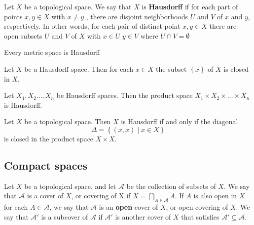 \documentclass{article}
\theoremstyle{remark}
\begin{document}
\begin{definition}[Hausdorff]

    Let $X $ be a topological space. We say that $X$ is \textbf{Hausdorff} if for each part of points $x,y  \in X $ with
    $x\neq y$ , there are disjoint neighborhoods $U$ and $V$ of $x$ and $y$, respectively. In other words, for each pair
    of distinct point $x,y \in  X$ there are open subsets $U$ and $V$ of $X$ with $x \in U$ $y \in V $ where $U \cap V =
    \emptyset $
\end{definition}

\begin{theorem}
    Every metric space is Hausdorff

\end{theorem}

\begin{theorem}
    Let $X$ be a Hausdorff space. Then for each $x \in X$ the subset $\left\{ x  \right\}$ of $X$ is closed in  $X$.
\end{theorem}


\begin{theorem}
    Let $X_{1}, X_{2} \ldots, X_{n} $ be Hausdorff spaces.  Then the product space $X_{1} \times  X_{2}\times  \ldots
    \times X_{n}  $ is Hausdorff.

\end{theorem}


\begin{theorem}
Let $X$ be a topological space.  Then $X$ is Hausdorff if and only if the diagonal \[
    \Delta = \left\{ \left( x,x \right)  \mid  x \in  X \right\}
\]is closed in the product space $X \times  X$.
\end{theorem}

\subsection{Compact spaces}%
\label{sub:compace_spaces}

\begin{definition}
    Let $X$ be a topological space, and let $\mathscr{A} $ be the collection of subsets of $X$. We say that  $
    \mathscr{A} $ is a cover of $X$, or covering of X if $X = \bigcap_{A \in \mathscr{A} }^{} A$. If $A$ is also open in
     $X$ for each  $A \in  \mathscr{A} $, we say that $\mathscr{A} $ is an \textbf{open} cover of $X$, or open
     covering of $X$. We say that $ \mathscr{A}' $ is a subcover of $\mathscr{A} $ if $\mathscr{A} '  $ is another
     cover of $X$ that satisfies  $ \mathscr{A '} \subseteq \mathscr{A}  $.
\end{definition}
\end{document}
